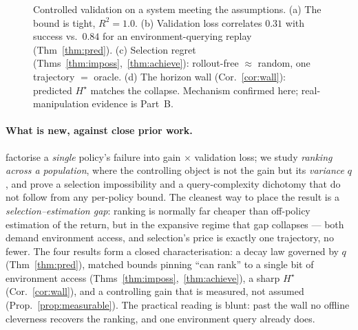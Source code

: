 \begin{figure}[t]\centering
{}\hfill
{}\hfill
{}\hfill
{}
\caption{Controlled validation on a system meeting the assumptions. (a) The bound is tight,
$R^2{=}1.0$. (b) Validation loss correlates $0.31$ with success vs.\ $0.84$ for an environment-querying
replay (Thm~\ref{thm:pred}). (c) Selection regret (Thms~\ref{thm:imposs},~\ref{thm:achieve}):
rollout-free $\approx$ random, one trajectory $=$ oracle. (d) The horizon wall (Cor.~\ref{cor:wall}):
predicted $H^\star$ matches the collapse. Mechanism confirmed here; real-manipulation evidence is
Part~B.}
\label{fig:bound}
\end{figure}

\paragraph{What is new, against close prior work.} \citet{tan2026gain} factorise a \emph{single}
policy's failure into gain $\times$ validation loss; we study \emph{ranking across a population}, where
the controlling object is not the gain but its \emph{variance} $q$, and prove a selection impossibility
and a query-complexity dichotomy that do not follow from any per-policy bound. The cleanest way to place
the result is a \emph{selection--estimation gap}: ranking is normally far cheaper than off-policy
estimation of the return, but in the expansive regime that gap collapses --- both demand environment
access, and selection's price is exactly one trajectory, no fewer. The four results form a closed
characterisation: a decay law governed by $q$ (Thm~\ref{thm:pred}), matched bounds pinning ``can rank''
to a single bit of environment access (Thms~\ref{thm:imposs},~\ref{thm:achieve}), a sharp $H^\star$
(Cor.~\ref{cor:wall}), and a controlling gain that is measured, not assumed (Prop.~\ref{prop:measurable}).
The practical reading is blunt: past the wall no offline cleverness recovers the ranking, and one
environment query already does.
